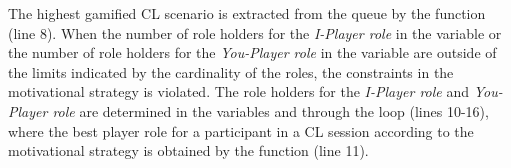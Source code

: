 The highest gamified CL scenario is extracted from the queue  by the function  (line 8). When the number of role holders for the \emph{I-Player role} in the variable  or the number of role holders for the \emph{You-Player role} in the variable  are outside of the limits indicated by the cardinality of the roles, the constraints in the motivational strategy  is violated. The role holders for the \emph{I-Player role} and \emph{You-Player role} are determined in the variables  and  through the loop  (lines 10-16), where the best player role  for a participant  in a CL session  according to the motivational strategy  is obtained by the function  (line 11).






